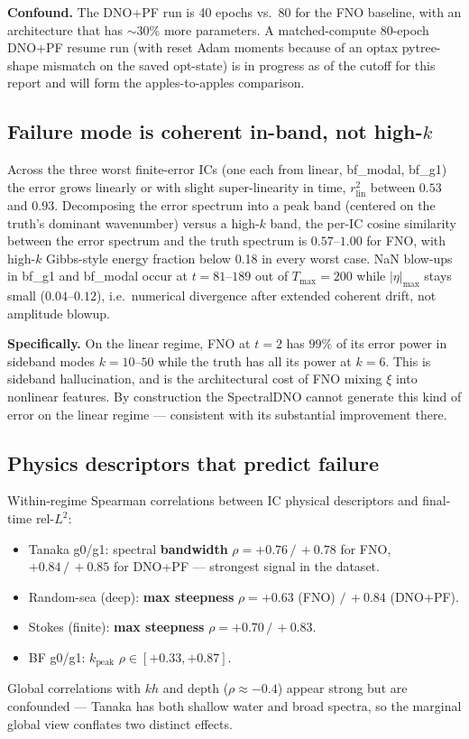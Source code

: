 \documentclass[11pt,letterpaper]{article}
\begin{document}
\textbf{Confound.} The DNO+PF run is 40 epochs vs.\ 80 for the FNO
baseline, with an architecture that has $\sim 30\%$ more parameters.
A matched-compute 80-epoch DNO+PF resume run (with reset Adam moments
because of an optax pytree-shape mismatch on the saved opt-state) is in
progress as of the cutoff for this report and will form the
apples-to-apples comparison.

\subsection{Failure mode is coherent in-band, not high-$k$}
\label{ssec:failure-mode}

Across the three worst finite-error ICs (one each from linear, bf\_modal,
bf\_g1) the error grows linearly or with slight super-linearity in
time, $r^{2}_{\mathrm{lin}}$ between $0.53$ and $0.93$. Decomposing the
error spectrum into a peak band (centered on the truth's dominant
wavenumber) versus a high-$k$ band, the per-IC cosine similarity
between the error spectrum and the truth spectrum is $0.57$--$1.00$ for
FNO, with high-$k$ Gibbs-style energy fraction below 0.18 in every
worst case. NaN blow-ups in bf\_g1 and bf\_modal occur at $t = 81$--$189$
out of $T_{\max}=200$ while $|\eta|_{\max}$ stays small ($0.04$--$0.12$),
i.e.\ numerical divergence after extended coherent drift, not amplitude
blowup.

\textbf{Specifically.} On the linear regime, FNO at $t=2$ has $99\%$ of
its error power in sideband modes $k=10$--$50$ while the truth has all
its power at $k=6$. This is sideband hallucination, and is the
architectural cost of FNO mixing $\xi$ into nonlinear features. By
construction the SpectralDNO cannot generate this kind of error on the
linear regime --- consistent with its substantial improvement there.

\subsection{Physics descriptors that predict failure}

Within-regime Spearman correlations between IC physical descriptors and
final-time rel-$L^{2}$:
\begin{itemize}[leftmargin=1.3em,itemsep=2pt]
  \item Tanaka g0/g1: spectral \textbf{bandwidth} $\rho = +0.76\,/\,+0.78$
        for FNO, $+0.84\,/\,+0.85$ for DNO+PF --- strongest signal in the
        dataset.
  \item Random-sea (deep): \textbf{max steepness} $\rho = +0.63$ (FNO)
        $/\,+0.84$ (DNO+PF).
  \item Stokes (finite): \textbf{max steepness} $\rho = +0.70\,/\,+0.83$.
  \item BF g0/g1: \textbf{$k_{\mathrm{peak}}$} $\rho \in [+0.33,+0.87]$.
\end{itemize}
Global correlations with $kh$ and depth ($\rho \approx -0.4$) appear
strong but are confounded --- Tanaka has both shallow water and broad
spectra, so the marginal global view conflates two distinct effects.
\end{document}
